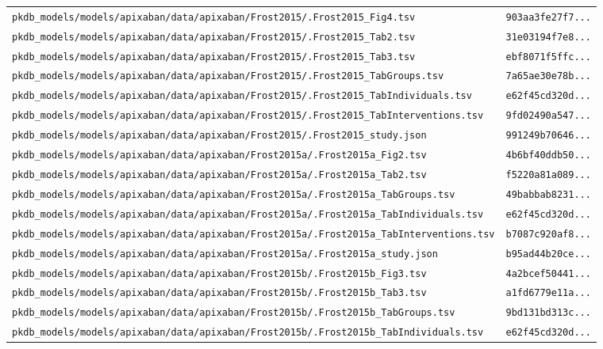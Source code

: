 \documentclass{article}
\begin{document}
\begin{longtable}{ll}
\texttt{pkdb\_models/models/apixaban/data/apixaban/Frost2015/.Frost2015\_Fig4.tsv} & \texttt{903aa3fe27f7...} \\
\texttt{pkdb\_models/models/apixaban/data/apixaban/Frost2015/.Frost2015\_Tab2.tsv} & \texttt{31e03194f7e8...} \\
\texttt{pkdb\_models/models/apixaban/data/apixaban/Frost2015/.Frost2015\_Tab3.tsv} & \texttt{ebf8071f5ffc...} \\
\texttt{pkdb\_models/models/apixaban/data/apixaban/Frost2015/.Frost2015\_TabGroups.tsv} & \texttt{7a65ae30e78b...} \\
\texttt{pkdb\_models/models/apixaban/data/apixaban/Frost2015/.Frost2015\_TabIndividuals.tsv} & \texttt{e62f45cd320d...} \\
\texttt{pkdb\_models/models/apixaban/data/apixaban/Frost2015/.Frost2015\_TabInterventions.tsv} & \texttt{9fd02490a547...} \\
\texttt{pkdb\_models/models/apixaban/data/apixaban/Frost2015/.Frost2015\_study.json} & \texttt{991249b70646...} \\
\texttt{pkdb\_models/models/apixaban/data/apixaban/Frost2015a/.Frost2015a\_Fig2.tsv} & \texttt{4b6bf40ddb50...} \\
\texttt{pkdb\_models/models/apixaban/data/apixaban/Frost2015a/.Frost2015a\_Tab2.tsv} & \texttt{f5220a81a089...} \\
\texttt{pkdb\_models/models/apixaban/data/apixaban/Frost2015a/.Frost2015a\_TabGroups.tsv} & \texttt{49babbab8231...} \\
\texttt{pkdb\_models/models/apixaban/data/apixaban/Frost2015a/.Frost2015a\_TabIndividuals.tsv} & \texttt{e62f45cd320d...} \\
\texttt{pkdb\_models/models/apixaban/data/apixaban/Frost2015a/.Frost2015a\_TabInterventions.tsv} & \texttt{b7087c920af8...} \\
\texttt{pkdb\_models/models/apixaban/data/apixaban/Frost2015a/.Frost2015a\_study.json} & \texttt{b95ad44b20ce...} \\
\texttt{pkdb\_models/models/apixaban/data/apixaban/Frost2015b/.Frost2015b\_Fig3.tsv} & \texttt{4a2bcef50441...} \\
\texttt{pkdb\_models/models/apixaban/data/apixaban/Frost2015b/.Frost2015b\_Tab3.tsv} & \texttt{a1fd6779e11a...} \\
\texttt{pkdb\_models/models/apixaban/data/apixaban/Frost2015b/.Frost2015b\_TabGroups.tsv} & \texttt{9bd131bd313c...} \\
\texttt{pkdb\_models/models/apixaban/data/apixaban/Frost2015b/.Frost2015b\_TabIndividuals.tsv} & \texttt{e62f45cd320d...} \\

\end{longtable}
\end{document}

